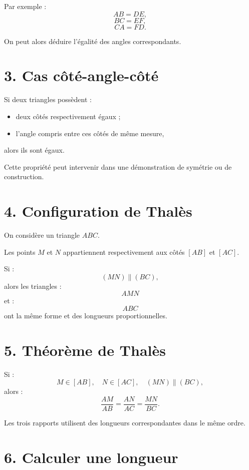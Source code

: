 Par exemple :
\[
AB=DE,
\]
\[
BC=EF,
\]
\[
CA=FD.
\]

On peut alors déduire l'égalité des angles correspondants.

\section{3. Cas côté-angle-côté}

Si deux triangles possèdent :
\begin{itemize}
\item deux côtés respectivement égaux ;
\item l'angle compris entre ces côtés de même mesure,
\end{itemize}
alors ils sont égaux.

Cette propriété peut intervenir dans une démonstration de symétrie ou de construction.

\section{4. Configuration de Thalès}

On considère un triangle $ABC$.

Les points $M$ et $N$ appartiennent respectivement aux côtés $[AB]$ et $[AC]$.

Si :
\[
(MN)\parallel(BC),
\]
alors les triangles :
\[
AMN
\]
et :
\[
ABC
\]
ont la même forme et des longueurs proportionnelles.


\section{5. Théorème de Thalès}

\begin{propriete}
Si :
\[
M\in[AB],
\quad
N\in[AC],
\quad
(MN)\parallel(BC),
\]
alors :
\[
\boxed{
\dfrac{AM}{AB}
=
\dfrac{AN}{AC}
=
\dfrac{MN}{BC}
}.
\]
\end{propriete}

Les trois rapports utilisent des longueurs correspondantes dans le même ordre.

\section{6. Calculer une longueur}

